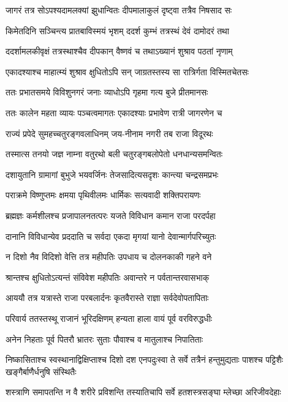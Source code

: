 \twolineshloka
{जागरं तत्र सोऽपश्यदामलक्यां झुधान्वितः}
{दीपमालाकुलं दृष्ट्वा तत्रैव निषसाद सः} %

\twolineshloka
{किमेतदिनि सञ्चिन्त्य प्रातबाविस्मयं भृशम्}
{ददर्श कुम्भं तत्रस्थं देवं दामोदरं तथा} %

\twolineshloka
{ददर्शामलकीवृक्षं तत्रस्थाश्चैव दीपकान्}
{वैष्णवं च तथाऽख्यानं शुश्राव पठतां नृणाम्} %

\twolineshloka
{एकादश्याश्च माहात्म्यं शुश्राव क्षुधितोऽपि सन्}
{जाग्रतस्तस्य सा रात्रिर्गता विस्मितचेतसः} %

\twolineshloka
{ततः प्रभातसमये विविशुनगरं जनाः}
{व्याधोऽपि गृहमा गत्य बुजे प्रीतमानसः} %

\twolineshloka
{ततः कालेन महता व्यायः पञ्चत्वमागतः}
{एकादश्याः प्रभावेण रात्री जागरणेन च} %

\twolineshloka
{राज्यं प्रपेदे सुमहच्चतुरङ्गवलाधिनम्}
{जय-नीनाम नगरी तब राजा विदूरथः} %

\twolineshloka
{तस्मात्स तनयो जज्ञ नाम्ना वतुरथो बली}
{चतुरङ्गबलोपेतो धनधान्यसमन्वितः} %

\twolineshloka
{दशायुतानि ग्रामागां बुभुजे भयवर्जिनः}
{तेजसादित्यसदृशः कान्त्या चन्द्रसमप्रभः} %

\twolineshloka
{पराक्रमे विष्णुप्तमः क्षमया पृथिवीलमः}
{धार्मिकः सत्यवादी शक्तिपरायणः} %

\twolineshloka
{ब्रह्मज्ञः कर्मशीलश्च प्रजापालनतत्परः}
{यजते विविधान कमान राजा परदर्पहा} %

\twolineshloka
{दानानि विविधान्येव प्रददाति च सर्वदा}
{एकदा मृगयां यानो देवान्मार्गपरिच्युतः} %

\twolineshloka
{न दिशो नैव विदिशो वेत्ति तत्र महीपतिः}
{उपधाय च दोलनकाकी गहने वने} %

\twolineshloka
{श्रान्तश्च क्षुधितोऽत्यन्तं संविवेश महीपतिः}
{अवान्तरे न पर्वतान्तरवासभाक्} %

\twolineshloka
{आययौ तत्र यत्रास्ते राजा परबलार्दनः}
{कृतवैरास्ते राज्ञा सर्वदेवोपतापिताः} %

\twolineshloka
{परिवार्य ततस्तस्थू राजानं भूरिदक्षिणम्}
{हन्यता हाला वायं पूर्व वरविरुद्धधीः} %

\twolineshloka
{अनेन निहताः पूर्व पितरौ भ्रातरः सुताः}
{पौवाश्च व मातुलाश्च निपातिताः} %


\threelineshloka
{निष्कासिताश्च स्वस्थानाद्विक्षिप्ताश्च दिशो दश}
{एनपदुःस्वा ते सर्वे तत्रैनं हन्तुमुद्यताः}
{पाशश्च पट्टिशैः खङ्गैर्बाणैर्धनुषि संस्थितैः} %

\twolineshloka
{शस्त्राणि समापतन्ति न वै शरीरे प्रविशन्ति}
{तस्यातिचापि सर्वे हतशस्त्रसङ्घा म्लेच्छा अरिजीवदेहाः} %

